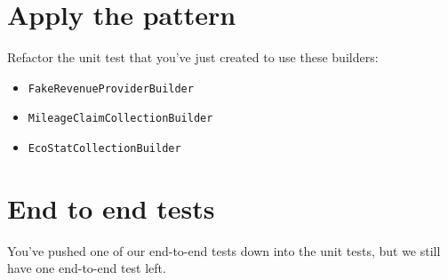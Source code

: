 \section*{Apply the pattern}

Refactor the unit test that you've just created to use these builders:

\begin{itemize}
    \item \texttt{FakeRevenueProviderBuilder}
    \item \texttt{MileageClaimCollectionBuilder}
    \item \texttt{EcoStatCollectionBuilder}
\end{itemize}



\section*{End to end tests}

You've pushed one of our end-to-end tests down into the unit tests, but we still have one end-to-end test left.




